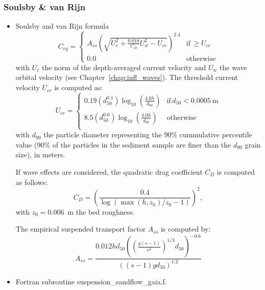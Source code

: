 \subsubsection{Soulsby \& van Rijn}
\begin{itemize}
\item Soulsby and van Rijn formula~\cite{Soulsby97} 
  \begin{equation*}
C_{eq}=\left\{\begin{array}{ll}
A_{ss}\left(\sqrt{U_c^2+\frac{0.018}{C_D}U_w^2-U_{cr}}\right)^{2.4} & \text{if}\, \geq U_{cr}\\
0.0 &  \text{otherwise}
\end{array}
\right.
\end{equation*}
  with $U_c$ the norm of the depth-averaged current velocity and $U_w$ the wave orbital velocity (see Chapter~\ref{chap:infl_waves}). The threshold current velocity $U_{cr}$ is computed as:
\begin{equation*}
U_{cr}=\left\{\begin{array}{ll}
  0.19 (d_{50}^{0.1})\log_{10}\left(\frac{4.0 h}{d_{90}}\right) & \text{if}\, d_{50} < 0.0005~\text{m}\\
  8.5 (d_{50}^{0.6})\log_{10}\left(\frac{4.0 h}{d_{90}}\right) & \text{otherwise}\\
\end{array}
\right.
\end{equation*}
with $d_{90}$ the particle diameter representing the 90\% cummulative percentile value (90\% of the particles in the sediment sample are finer than the $d_{90}$ grain size), in meters.

If wave effects are considered, the quadratic drag coefficient $C_D$ is computed as follows:
\begin{equation*}
  C_D = \left(\frac{0.4}{\log(\max(h, z_{0})/z_{0}-1)}\right)^{2},
\end{equation*}
with $z_{0}=0.006$~m the bed roughness.

The empirical suspended transport factor $A_{ss}$ is computed by:
\begin{equation*}
A_{ss} = \frac{0.012 h d_{50} \left(\left(\frac{g(s-1)}{\nu^2}\right)^{1/3}d_{50}\right)^{-0.6}}{\left((s-1)g d_{50}\right)^{1.2}}
\end{equation*}
\item Fortran subroutine {\ttfamily suspension\_sandflow\_gaia.f}.
\end{itemize}

